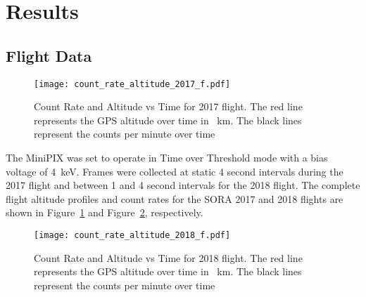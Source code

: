 \section{Results}
\label{Results}

\subsection{Flight Data}

\begin{figure}[H]
\centering
\texttt{[image: count\_rate\_altitude\_2017\_f.pdf]} %
\caption{Count Rate and Altitude vs Time for 2017 flight. The red line represents the GPS altitude over time in \SI{}{\km}.  The black lines represent the counts per minute over time}
\label{fig:ratealttime_2017}
\end{figure}
%
The MiniPIX was set to operate in Time over Threshold mode with a bias voltage of \SI{4}{\kilo\eV}.  Frames were collected at static 4 second intervals during the 2017 flight and between 1 and 4 second intervals for the 2018 flight.  The complete flight altitude profiles and count rates for the SORA  2017 and 2018 flights are shown in Figure~\ref{fig:ratealttime_2017} and Figure~\ref{fig:ratealttime_2018}, respectively.
%
\begin{figure}[H]
\centering
\texttt{[image: count\_rate\_altitude\_2018\_f.pdf]}%
\caption{Count Rate and Altitude vs Time for 2018 flight. The red line represents the GPS altitude over time in \SI{}{\km}.  The black lines represent the counts per minute over time}
\label{fig:ratealttime_2018}
\end{figure}
